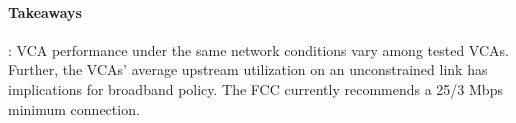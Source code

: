 \begin{mdframed}[roundcorner=5pt, backgroundcolor=black!10]
\paragraph{Takeaways}: VCA  performance under the same network
conditions vary among tested VCAs. Further, the VCAs’
average upstream utilization on an unconstrained link
has implications for broadband policy. The FCC currently recommends a 25/3 Mbps minimum connection. 
\end{mdframed}

